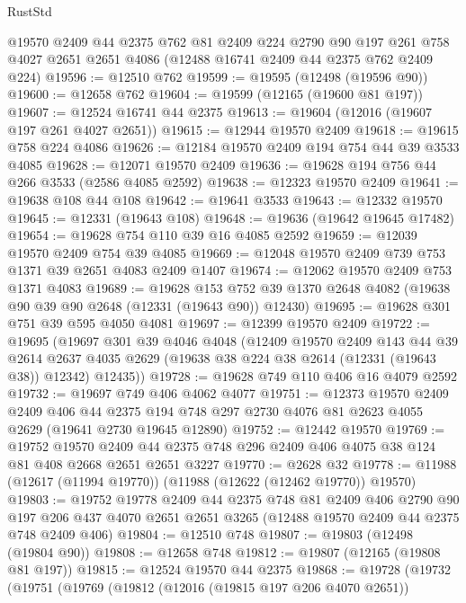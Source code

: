 \begin{lexlean}{RustStd}
\begin{coremodule}
    @19570
    @2409
    @44
    @2375
    @762
    @81
    @2409
    @224
    @2790
    @90
    @197
    @261
    @758
    @4027
    @2651
    @2651
    @4086
    (@12488 @16741 @2409 @44 @2375 @762 @2409 @224)
@19596 := @12510 @762
@19599 := @19595 (@12498 (@19596 @90))
@19600 := @12658 @762
@19604 := @19599 (@12165 (@19600 @81 @197))
@19607 := @12524 @16741 @44 @2375
@19613 := @19604 (@12016 (@19607 @197 @261 @4027 @2651))
@19615 := @12944 @19570 @2409
@19618 := @19615 @758 @224 @4086
@19626 := @12184 @19570 @2409 @194 @754 @44 @39 @3533 @4085
@19628 := @12071 @19570 @2409
@19636 := @19628 @194 @756 @44 @266 @3533 (@2586 @4085 @2592)
@19638 := @12323 @19570 @2409
@19641 := @19638 @108 @44 @108
@19642 := @19641 @3533
@19643 := @12332 @19570
@19645 := @12331 (@19643 @108)
@19648 := @19636 (@19642 @19645 @17482)
@19654 := @19628 @754 @110 @39 @16 @4085 @2592
@19659 := @12039 @19570 @2409 @754 @39 @4085
@19669 := @12048 @19570 @2409 @739 @753 @1371 @39 @2651 @4083 @2409 @1407
@19674 := @12062 @19570 @2409 @753 @1371 @4083
@19689 := @19628
    @153
    @752
    @39
    @1370
    @2648
    @4082
    (@19638 @90 @39 @90 @2648 (@12331 (@19643 @90)) @12430)
@19695 := @19628 @301 @751 @39 @595 @4050 @4081
@19697 := @12399 @19570 @2409
@19722 := @19695
    (@19697
      @301
      @39
      @4046
      @4048
      (@12409
        @19570
        @2409
        @143
        @44
        @39
        @2614
        @2637
        @4035
        @2629
        (@19638 @38 @224 @38 @2614 (@12331 (@19643 @38)) @12342)
        @12435))
@19728 := @19628 @749 @110 @406 @16 @4079 @2592
@19732 := @19697 @749 @406 @4062 @4077
@19751 := @12373
    @19570
    @2409
    @2409
    @406
    @44
    @2375
    @194
    @748
    @297
    @2730
    @4076
    @81
    @2623
    @4055
    @2629
    (@19641 @2730 @19645 @12890)
@19752 := @12442 @19570
@19769 := @19752
    @19570
    @2409
    @44
    @2375
    @748
    @296
    @2409
    @406
    @4075
    @38
    @124
    @81
    @408
    @2668
    @2651
    @2651
    @3227
@19770 := @2628 @32
@19778 := @11988 (@12617 (@11994 @19770)) (@11988 (@12622 (@12462 @19770)) @19570)
@19803 := @19752
    @19778
    @2409
    @44
    @2375
    @748
    @81
    @2409
    @406
    @2790
    @90
    @197
    @206
    @437
    @4070
    @2651
    @2651
    @3265
    (@12488 @19570 @2409 @44 @2375 @748 @2409 @406)
@19804 := @12510 @748
@19807 := @19803 (@12498 (@19804 @90))
@19808 := @12658 @748
@19812 := @19807 (@12165 (@19808 @81 @197))
@19815 := @12524 @19570 @44 @2375
@19868 := @19728
    (@19732
      (@19751
        (@19769
          (@19812
            (@12016 (@19815 @197 @206 @4070 @2651))

\end{coremodule}
\end{lexlean}
